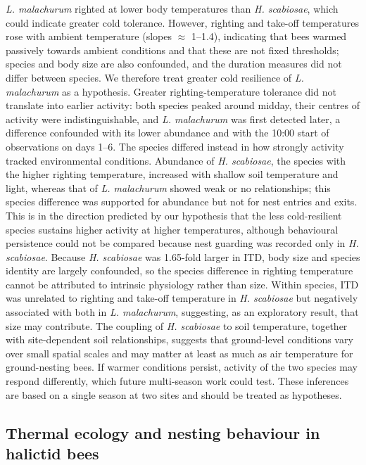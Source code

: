 \documentclass[11pt,a4paper]{article}
\begin{document}
\textit{L. malachurum} righted at lower body temperatures than \textit{H. scabiosae}, which could indicate greater cold tolerance. However, righting and take-off temperatures rose with ambient temperature (slopes $\approx$ 1--1.4), indicating that bees warmed passively towards ambient conditions and that these are not fixed thresholds; species and body size are also confounded, and the duration measures did not differ between species. We therefore treat greater cold resilience of \textit{L. malachurum} as a hypothesis. Greater righting-temperature tolerance did not translate into earlier activity: both species peaked around midday, their centres of activity were indistinguishable, and \textit{L. malachurum} was first detected later, a difference confounded with its lower abundance and with the 10:00 start of observations on days 1--6. The species differed instead in how strongly activity tracked environmental conditions. Abundance of \textit{H. scabiosae}, the species with the higher righting temperature, increased with shallow soil temperature and light, whereas that of \textit{L. malachurum} showed weak or no relationships; this species difference was supported for abundance but not for nest entries and exits. This is in the direction predicted by our hypothesis that the less cold-resilient species sustains higher activity at higher temperatures, although behavioural persistence could not be compared because nest guarding was recorded only in \textit{H. scabiosae}. Because \textit{H. scabiosae} was 1.65-fold larger in ITD, body size and species identity are largely confounded, so the species difference in righting temperature cannot be attributed to intrinsic physiology rather than size. Within species, ITD was unrelated to righting and take-off temperature in \textit{H. scabiosae} but negatively associated with both in \textit{L. malachurum}, suggesting, as an exploratory result, that size may contribute. The coupling of \textit{H. scabiosae} to soil temperature, together with site-dependent soil relationships, suggests that ground-level conditions vary over small spatial scales and may matter at least as much as air temperature for ground-nesting bees. If warmer conditions persist, activity of the two species may respond differently, which future multi-season work could test. These inferences are based on a single season at two sites and should be treated as hypotheses.

\subsection{Thermal ecology and nesting behaviour in halictid bees}
\end{document}

